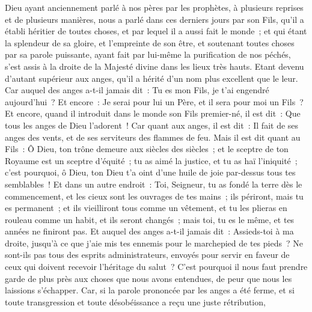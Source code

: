 \begin{multicols}{2}
\VerseOne{}Dieu ayant anciennement parlé à nos pères par les prophètes, à plusieurs reprises et de plusieurs manières,
nous a parlé dans ces derniers jours par son Fils, qu'il a établi héritier de toutes choses, et par lequel il a aussi fait le monde~;
et qui étant la splendeur de sa gloire, et l'empreinte de son être, et soutenant toutes choses par sa parole puissante, ayant fait par lui-même la purification de nos péchés, s'est assis à la droite de la Majesté divine dans les lieux très hauts.
Etant devenu d'autant supérieur aux anges, qu'il a hérité d'un nom plus excellent que le leur.
Car auquel des anges a-t-il jamais dit~: Tu es mon Fils, je t'ai engendré aujourd'hui~? Et encore~: Je serai pour lui un Père, et il sera pour moi un Fils~?
Et encore, quand il introduit dans le monde son Fils premier-né, il est dit~: Que tous les anges de Dieu l'adorent~!
Car quant aux anges, il est dit~: Il fait de ses anges des vents, et de ses serviteurs des flammes de feu.
Mais il est dit quant au Fils~: Ô Dieu, ton trône demeure aux siècles des siècles~; et le sceptre de ton Royaume est un sceptre d'équité~;
tu as aimé la justice, et tu as haï l'iniquité~; c'est pourquoi, ô Dieu, ton Dieu t'a oint d'une huile de joie par-dessus tous tes semblables~!
Et dans un autre endroit~: Toi, Seigneur, tu as fondé la terre dès le commencement, et les cieux sont les ouvrages de tes mains~;
ils périront, mais tu es permanent~; et ils vieilliront tous comme un vêtement,
et tu les plieras en rouleau comme un habit, et ils seront changés~; mais toi, tu es le même, et tes années ne finiront pas.
Et auquel des anges a-t-il jamais dit~: Assieds-toi à ma droite, jusqu'à ce que j'aie mis tes ennemis pour le marchepied de tes pieds~?
Ne sont-ils pas tous des esprits administrateurs, envoyés pour servir en faveur de ceux qui doivent recevoir l'héritage du salut~?
\VerseOne{}C'est pourquoi il nous faut prendre garde de plus près aux choses que nous avons entendues, de peur que nous les laissions s'échapper.
Car, si la parole prononcée par les anges a été ferme, et si toute transgression et toute désobéissance a reçu une juste rétribution,

\end{multicols}
